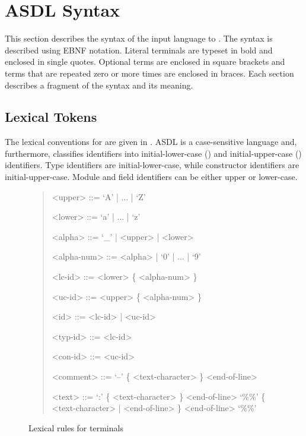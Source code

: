 %
\chapter{ASDL Syntax}
\label{chap:syntax}

This section describes the syntax of the input language to \asdlgen{}.
The syntax is described using EBNF notation.
Literal terminals are typeset in bold and enclosed in single quotes.
Optional terms are enclosed in square brackets and terms that are
repeated zero or more times are enclosed in braces.
Each section describes a fragment of the syntax and its meaning.

\section{Lexical Tokens}

The lexical conventions for \asdl{} are given in .
ASDL is a case-sensitive language and, furthermore, classifies identifiers
into initial-lower-case () and initial-upper-case () identifiers.
Type identifiers are initial-lower-case, while constructor identifiers are initial-upper-case.
Module and field identifiers can be either upper or lower-case.

\begin{figure}[t]
  \begin{quote}
    \begin{grammar}
      <upper>     ::= `A' | ... | `Z'

      <lower>     ::= `a' | ... | `z'

      <alpha>     ::= `_' | <upper> | <lower>

      <alpha-num> ::= <alpha> | `0' | ... | `9'

      <lc-id>     ::= <lower> \{ <alpha-num> \}
      
      <uc-id>     ::= <upper> \{ <alpha-num> \}

      <id>        ::= <lc-id> | <uc-id>
                  
      <typ-id>    ::= <lc-id>

      <con-id>    ::= <uc-id>

      <comment>   ::= `--' \{ <text-character> \} <end-of-line>

      <text>      ::= `:' \{ <text-character> \} <end-of-line>
               \alt{} `\%\%' \{ <text-character> | <end-of-line> \} <end-of-line> `\%\%'
    \end{grammar}
  \end{quote}
  \caption{Lexical rules for \asdl{} terminals}
  \label{fig:lexical-syntax}
\end{figure}%

